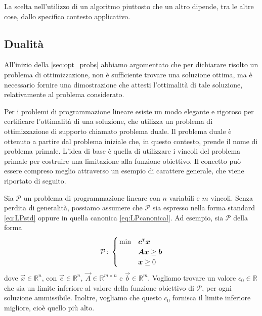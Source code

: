 La scelta nell'utilizzo di un algoritmo piuttosto che un altro dipende, tra
le altre cose, dallo specifico contesto applicativo.

\subsection{Dualità}
All'inizio della \cref{sec:opt_probs} abbiamo argomentato che per
dichiarare risolto un problema di ottimizzazione, non è sufficiente trovare
una soluzione ottima, ma è necessario fornire una dimostrazione
che attesti l'ottimalità di tale soluzione, relativamente al problema
considerato.

Per i problemi di programmazione lineare esiste un modo elegante e rigoroso
per certificare l'ottimalità di una soluzione, che utilizza un problema di
ottimizzazione di supporto chiamato problema duale. Il problema duale è
ottenuto a partire dal problema iniziale che, in questo contesto, prende il
nome di problema primale. L'idea di base è quella di utilizzare i vincoli
del problema primale per costruire una limitazione alla funzione obiettivo.
Il concetto può essere compreso meglio attraverso un esempio di carattere
generale, che viene riportato di seguito.

Sia $\mathcal{P}$ un problema di programmazione lineare con $n$ variabili e
$m$ vincoli. Senza perdita di generalità, possiamo assumere che
$\mathcal{P}$ sia espresso nella forma standard \eqref{eq:LPstd} oppure in
quella canonica \eqref{eq:LPcanonical}. Ad esempio, sia $\mathcal{P}$ della
forma
\begin{equation}
    \mathcal{P}\colon
    \begin{cases}
        \,\min & \bm{c}^{\scriptscriptstyle\mathrm{T}} \bm{x} \\
               & \bm{A} \bm{x} \ge \bm{b} \\
             & \bm{x} \ge 0
    \end{cases}\\[5pt]
\end{equation}
dove $\vec{x} \in \mathbb{R}^n$, con $\vec{c} \in \mathbb{R}^n,\ \vec{A}
\in \mathbb{R}^{m \times n}$ e $\vec{b} \in \mathbb{R}^m$. Vogliamo trovare
un valore $c_{0} \in \mathbb{R}$ che sia un limite inferiore al valore
della funzione obiettivo di $\mathcal{P}$, per ogni soluzione ammissibile.
Inoltre, vogliamo che questo $c_{0}$ fornisca il limite inferiore migliore,
cioè quello più alto.

